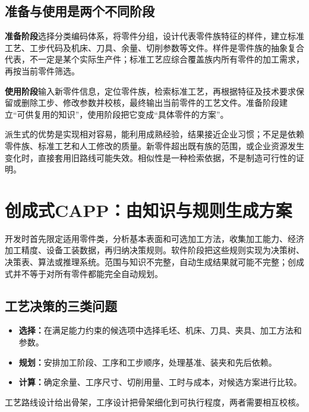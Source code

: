 

\subsection{准备与使用是两个不同阶段}
\textbf{准备阶段}选择分类编码体系，将零件分组，设计代表零件族特征的样件，建立标准工艺、工步代码及机床、刀具、余量、切削参数等文件。样件是零件族的抽象复合代表，不一定是某个实际生产件；标准工艺应综合覆盖族内所有零件的加工需求，再按当前零件筛选。

\textbf{使用阶段}输入新零件信息，定位零件族，检索标准工艺，再根据特征及技术要求保留或删除工步、修改参数并校核，最终输出当前零件的工艺文件。准备阶段建立“可供复用的知识”，使用阶段把它变成“具体零件的方案”。


派生式的优势是实现相对容易，能利用成熟经验，结果接近企业习惯；不足是依赖零件族、标准工艺和人工修改的质量。新零件超出既有族的范围，或企业资源发生变化时，直接套用旧路线可能失效。相似性是一种检索依据，不是制造可行性的证明。

\section{创成式CAPP：由知识与规则生成方案}


开发时首先限定适用零件类，分析基本表面和可选加工方法，收集加工能力、经济加工精度、设备工装数据，再归纳决策规则。软件阶段把这些规则实现为决策树、决策表、算法或推理系统。范围与知识不完整，自动生成结果就可能不完整；创成式并不等于对所有零件都能完全自动规划。

\subsection{工艺决策的三类问题}
\begin{itemize}
\item \textbf{选择：}在满足能力约束的候选项中选择毛坯、机床、刀具、夹具、加工方法和参数。
\item \textbf{规划：}安排加工阶段、工序和工步顺序，处理基准、装夹和先后依赖。
\item \textbf{计算：}确定余量、工序尺寸、切削用量、工时与成本，对候选方案进行比较。
\end{itemize}
工艺路线设计给出骨架，工序设计把骨架细化到可执行程度，两者需要相互校核。

